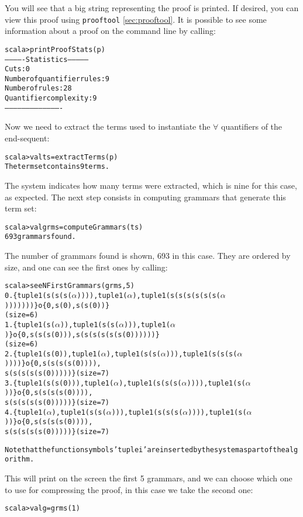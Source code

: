 \documentclass[a4paper, 11pt]{report}
\begin{document}
You will see that a big string representing the proof is printed. If desired,
you can view this proof using \texttt{prooftool} \ref{sec:prooftool}. 
It is possible to see some information about a proof on the command line by calling:
{\small
  \begin{alltt}
    scala> printProofStats(p)
    ------------- Statistics ---------------
    Cuts: 0
    Number of quantifier rules: 9
    Number of rules: 28
    Quantifier complexity: 9
    ----------------------------------------
  \end{alltt}
}
Now we need to
extract the terms used to instantiate the $\forall$ quantifiers of the
end-sequent:
{\small
  \begin{alltt}
    scala> val ts = extractTerms(p)
    The term set contains 9 terms.
  \end{alltt}
}
The system indicates how many terms were extracted, which is nine for this case,
as expected. The next step consists in computing grammars that generate this
term set:
{\small
  \begin{alltt}
    scala> val grms = computeGrammars(ts)
    693 grammars found.
  \end{alltt}
}
The number of grammars found is shown, 693 in this case. They are ordered
by size, and one can see the first ones by calling:
{\small
  \begin{alltt}
    scala> seeNFirstGrammars(grms, 5)
    0. \{ tuple1(s(s(s(\(\alpha\))))), tuple1(\(\alpha\)), tuple1(s(s(s(s(s(s(\(\alpha\)))))))) \} o \{ 0, s(0), s(s(0)) \}
    (size = 6)
    1. \{ tuple1(s(\(\alpha\))), tuple1(s(s(\(\alpha\)))), tuple1(\(\alpha\)) \} o \{ 0, s(s(s(0))), s(s(s(s(s(s(0)))))) \}
    (size = 6)
    2. \{ tuple1(s(0)), tuple1(\(\alpha\)), tuple1(s(s(\(\alpha\)))), tuple1(s(s(s(\(\alpha\))))) \} o \{ 0, s(s(s(s(0)))), 
    s(s(s(s(s(0))))) \}(size = 7)
    3. \{ tuple1(s(s(0))), tuple1(\(\alpha\)), tuple1(s(s(s(\(\alpha\))))), tuple1(s(\(\alpha\))) \} o \{ 0, s(s(s(s(0)))), 
    s(s(s(s(s(0))))) \}(size = 7)
    4. \{ tuple1(\(\alpha\)), tuple1(s(s(\(\alpha\)))), tuple1(s(s(s(\(\alpha\))))), tuple1(s(\(\alpha\))) \} o \{ 0, s(s(s(s(0)))), 
    s(s(s(s(s(0))))) \}(size = 7)

    Note that the function symbols 'tuplei' are inserted by the system as part of the algorithm.
  \end{alltt}
}
This will print on the screen the first 5 grammars, and we can choose which one
to use for compressing the proof, in this case we take the second one:
{\small
  \begin{alltt}
    scala> val g = grms(1)
  \end{alltt}
}
\end{document}

